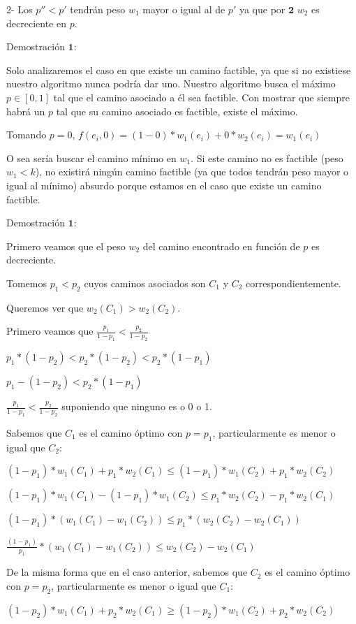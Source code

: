 2- Los $p'' < p'$ tendrán peso $w_1$ mayor o igual al de $p'$ ya que por $\mathbf{2}$ $w_2$ es decreciente en $p$.


Demostraci\'on $\mathbf{1}:$

Solo analizaremos el caso en que existe un camino factible, ya que si no existiese nuestro algoritmo nunca podr\'ia dar uno.
Nuestro algoritmo busca el m\'aximo $p \in [0,1]$ tal que el camino asociado a \'el sea factible. Con mostrar que siempre habrá un $p$ tal que su camino asociado es factible, existe el m\'aximo.

Tomando $p=0$, $f(e_i,0) = (1-0)*w_1(e_i) + 0*w_2(e_i) = w_1(e_i)$

O sea ser\'ia buscar el camino m\'inimo en $w_1$. Si este camino no es factible (peso $w_1 < k$), no existirá ningún camino factible (ya que todos tendrán peso mayor o igual al m\'inimo) absurdo porque estamos en el caso que existe un camino factible.

Demostraci\'on $\mathbf{1}:$

Primero veamos que el peso $w_2$ del camino encontrado en función de $p$ es decreciente.

Tomemos $p_1 < p_2$ cuyos caminos asociados son $C_1$ y $C_2$ correspondientemente.

Queremos ver que $w_2(C_1) > w_2(C_2)$.

Primero veamos que $\frac{p_1}{1-p_1} < \frac{p_2}{1-p_2}$

$ p_1* (1-p_2) < p_2 * (1-p_2) < p_2 * (1-p_1)$

$ p_1 - (1-p_2) < p_2 * (1-p_1)$

$ \frac{p_1}{1-p_1} < \frac{p_2}{1-p_2} $ suponiendo que ninguno es o 0 o 1.


Sabemos que $C_1$ es el camino óptimo con $p=p_1$, particularmente es menor o igual que $C_2$:

$(1-p_1)*w_1(C_1) + p_1*w_2(C_1) \leq (1-p_1)*w_1(C_2) + p_1*w_2(C_2) $

$(1-p_1)*w_1(C_1) - (1-p_1)*w_1(C_2) \leq  p_1*w_2(C_2) - p_1*w_2(C_1) $

$(1-p_1)*(w_1(C_1) - w_1(C_2)) \leq  p_1*(w_2(C_2) - w_2(C_1)) $

$\frac{(1-p_1)}{p_1}*(w_1(C_1) - w_1(C_2)) \leq  w_2(C_2) - w_2(C_1) $

De la misma forma que en el caso anterior, sabemos que $C_2$ es el camino óptimo con $p=p_2$, particularmente es menor o igual que $C_1$:

$(1-p_2)*w_1(C_1) + p_2*w_2(C_1) \geq (1-p_2)*w_1(C_2) + p_2*w_2(C_2) $

